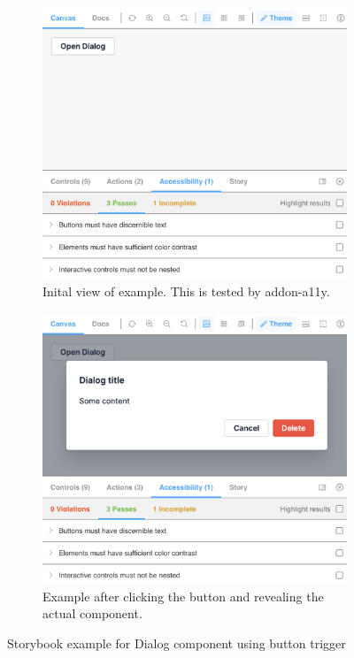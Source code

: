 \documentclass{master_thesis}
\begin{document}
\begin{figure}[ht]
	\begin{subfigure}{0.45\textwidth}
	\includegraphics[width=\textwidth]{img/sb-button-trigger.png}
	\caption{Inital view of example. This is tested by addon-a11y.}
	\label{fig:sb-button-trigger-1}
	\end{subfigure}
	\hspace{0.05\textwidth}
	\begin{subfigure}{0.45\textwidth}
	\includegraphics[width=\textwidth]{img/sb-button-trigger-open.png}
	\caption{Example after clicking the button and revealing the actual component.}
	\label{fig:sb-button-trigger-2}
	\end{subfigure}
\caption{Storybook example for Dialog component using button trigger}
\label{fig:sb-button-trigger}
\end{figure}
\end{document}
